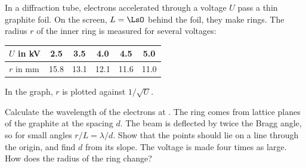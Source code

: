 In a diffraction tube, electrons accelerated through a voltage $U$ pass a thin graphite foil. On the screen, $L = \LsO$ behind the foil, they make rings. The radius $r$ of the inner ring is measured for several voltages:

\begin{center}
\begin{tabular}{l|ccccc}
$U$ in \si{\kilo\volt} & 2.5 & 3.5 & 4.0 & 4.5 & 5.0 \\ \hline
$r$ in \si{\milli\meter} & 15.8 & 13.1 & 12.1 & 11.6 & 11.0
\end{tabular}
\end{center}

In the graph, $r$ is plotted against $1/\sqrt{U}$.

\begin{center}
\end{center}

\begin{abcliste}
\abc Calculate the wavelength of the electrons at \UAO.
\abc The ring comes from lattice planes of the graphite at the spacing $d$. The beam is deflected by twice the Bragg angle, so for small angles $r/L = \lambda/d$. Show that the points should lie on a line through the origin, and find $d$ from its slope.
\abc The voltage is made four times as large. How does the radius of the ring change?
\end{abcliste}
